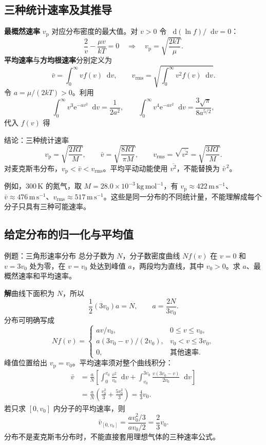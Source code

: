 \documentclass[UTF8,fontset=none,zihao=-4,a4paper]{ctexart}
\newcommand{\term}[1]{\textbf{#1}}
\newcommand{\dd}{\mathop{}\!\mathrm{d}}
\newcommand{\ee}{\mathrm{e}}
\newcommand{\unit}[1]{\,\mathrm{#1}}
\newcommand{\sol}{\par\noindent\textbf{解}\quad}
\begin{document}
\subsection{三种统计速率及其推导}
\term{最概然速率} $v_{\mathrm p}$ 对应分布密度的最大值。对 $v>0$ 令 $\dd(\ln f)/\dd v=0$：
\[
 \frac{2}{v}-\frac{\mu v}{kT}=0
 \quad\Longrightarrow\quad v_{\mathrm p}=\sqrt{\frac{2kT}{\mu}}.
\]
\term{平均速率}与\term{方均根速率}分别定义为
\[
 \bar v=\int_0^\infty vf(v)\dd v,
 \qquad v_{\mathrm{rms}}=\sqrt{\int_0^\infty v^2f(v)\dd v}.
\]
令 $a=\mu/(2kT)>0$。利用
\[
 \int_0^\infty v^3\ee^{-av^2}\dd v=\frac{1}{2a^2},
 \qquad
 \int_0^\infty v^4\ee^{-av^2}\dd v=\frac{3\sqrt\pi}{8a^{5/2}},
\]
代入 $f(v)$ 得
\begin{infobox}[breakable=false]{结论：三种统计速率}
\[
 v_{\mathrm p}=\sqrt{\frac{2RT}{M}},\qquad
 \bar v=\sqrt{\frac{8RT}{\pi M}},\qquad
 v_{\mathrm{rms}}=\sqrt{\overline{v^2}}=\sqrt{\frac{3RT}{M}}.
\]
对麦克斯韦分布，$v_{\mathrm p}<\bar v<v_{\mathrm{rms}}$。平均平动动能使用 $\overline{v^2}$，不能替换为 $\bar v^{\,2}$。
\end{infobox}
例如，$300\unit K$ 的氮气，取 $M=28.0\times10^{-3}\unit{kg\,mol^{-1}}$，有 $v_{\mathrm p}\approx422\unit{m\,s^{-1}}$、$\bar v\approx476\unit{m\,s^{-1}}$、$v_{\mathrm{rms}}\approx517\unit{m\,s^{-1}}$。这些是同一分布的不同统计量，不能理解成每个分子只具有三种可能速率。

\subsection{给定分布的归一化与平均值}
\begin{infobox}{例题：三角形速率分布}
总分子数为 $N$，分子数密度曲线 $Nf(v)$ 在 $v=0$ 和 $v=3v_0$ 处为零，在 $v=v_0$ 处达到峰值 $a$，两段均为直线，其中 $v_0>0$。求 $a$、最概然速率和平均速率。
\end{infobox}
\sol 曲线下面积为 $N$，所以
\[
 \frac12(3v_0)a=N,\qquad a=\frac{2N}{3v_0}.
\]
分布可明确写成
\[
 Nf(v)=\begin{cases}
 av/v_0,&0\le v\le v_0,\\
 a(3v_0-v)/(2v_0),&v_0<v\le3v_0,\\
 0,&\text{其他速率}.
 \end{cases}
\]
峰值位置给出 $v_{\mathrm p}=v_0$。平均速率须对整个曲线积分：
\begin{align*}
 \bar v&=\frac aN\left[
 \int_0^{v_0}\frac{v^2}{v_0}\dd v+
 \int_{v_0}^{3v_0}\frac{v(3v_0-v)}{2v_0}\dd v\right]\\
 &=\frac aN\left(\frac{v_0^2}{3}+\frac{5v_0^2}{3}\right)
 =\frac43v_0.
\end{align*}
若只求 $[0,v_0]$ 内分子的平均速率，则
\[
 \bar v_{[0,v_0]}=
 \frac{av_0^2/3}{av_0/2}=\frac23v_0.
\]
分布不是麦克斯韦分布时，不能直接套用理想气体的三种速率公式。
\end{document}
